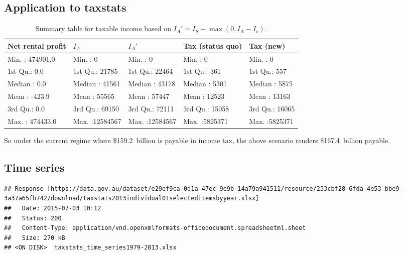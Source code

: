 \documentclass{grattan}\usepackage[]{graphicx}\usepackage[]{color}
\makeatletter
\newenvironment{kframe}{%
 \def\at@end@of@kframe{}%
 \ifinner\ifhmode%
  \def\at@end@of@kframe{\end{minipage}}%
  \begin{minipage}{\columnwidth}%
 \fi\fi%
 \def\FrameCommand##1{\hskip\@totalleftmargin \hskip-\fboxsep
 \colorbox{shadecolor}{##1}\hskip-\fboxsep
     \hskip-\linewidth \hskip-\@totalleftmargin \hskip\columnwidth}%
 \MakeFramed {\advance\hsize-\width
   \@totalleftmargin\z@ \linewidth\hsize
   \@setminipage}}%
 {\par\unskip\endMakeFramed%
 \at@end@of@kframe}
\newenvironment{knitrout}{}{} %
\makeatother
\begin{document}
\subsection{Application to taxstats}
\begin{table*}[ht]
\centering
\caption{Summary table for taxable income based on $I_A' = I_S + \max(0, I_A - I_s)$.} 
\begin{tabular}{lllll}
  \hline
Net rental profit &     $I_A$ &     $I_A'$ & Tax (status quo) &   Tax (new) \\ 
  \hline
Min.   :-474901.0   & Min.   :       0   & Min.   :       0   & Min.   :      0   & Min.   :      0   \\ 
  1st Qu.:      0.0   & 1st Qu.:   21785   & 1st Qu.:   22464   & 1st Qu.:    361   & 1st Qu.:    557   \\ 
  Median :      0.0   & Median :   41561   & Median :   43178   & Median :   5301   & Median :   5875   \\ 
  Mean   :   -423.9   & Mean   :   55565   & Mean   :   57447   & Mean   :  12523   & Mean   :  13163   \\ 
  3rd Qu.:      0.0   & 3rd Qu.:   69150   & 3rd Qu.:   72111   & 3rd Qu.:  15058   & 3rd Qu.:  16065   \\ 
  Max.   : 474433.0   & Max.   :12584567   & Max.   :12584567   & Max.   :5825371   & Max.   :5825371   \\ 
   \hline
\end{tabular}
\end{table*}

So under the current regime where \$159.2~billion is payable in income tax, the above scenario renders \$167.4~billion payable.
\clearpage


\subsection{Time series}
\begin{knitrout}
\color{fgcolor}\begin{kframe}
\begin{verbatim}
## Response [https://data.gov.au/dataset/e29ef9ca-0d1a-47ec-9e9b-14a79a941511/resource/233cbf28-6fda-4e53-bbe9-3a37a65fb742/download/taxstats2013individual01selecteditemsbyyear.xlsx]
##   Date: 2015-07-03 10:12
##   Status: 200
##   Content-Type: application/vnd.openxmlformats-officedocument.spreadsheetml.sheet
##   Size: 270 kB
## <ON DISK>  taxstats_time_series1979-2013.xlsx
\end{verbatim}
\end{kframe}
\end{knitrout}
\end{document}
